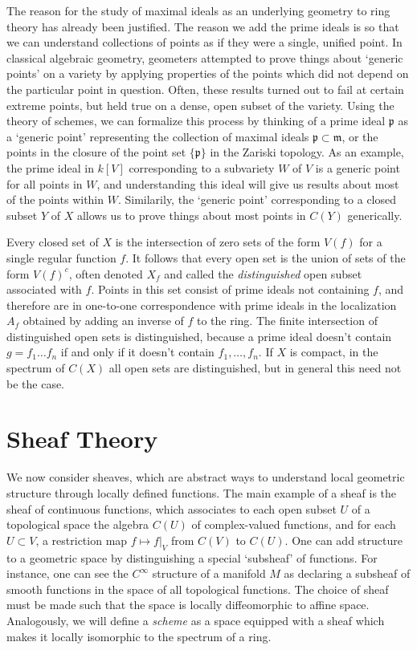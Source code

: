 The reason for the study of maximal ideals as an underlying geometry to ring theory has already been justified. The reason we add the prime ideals is so that we can understand collections of points as if they were a single, unified point. In classical algebraic geometry, geometers attempted to prove things about `generic points' on a variety by applying properties of the points which did not depend on the particular point in question. Often, these results turned out to fail at certain extreme points, but held true on a dense, open subset of the variety. Using the theory of schemes, we can formalize this process by thinking of a prime ideal $\mathfrak{p}$ as a `generic point' representing the collection of maximal ideals $\mathfrak{p} \subset \mathfrak{m}$, or the points in the closure of the point set $\{ \mathfrak{p} \}$ in the Zariski topology. As an example, the prime ideal in $k[V]$ corresponding to a subvariety $W$ of $V$ is a generic point for all points in $W$, and understanding this ideal will give us results about most of the points within $W$. Similarily, the `generic point' corresponding to a closed subset $Y$ of $X$ allows us to prove things about most points in $C(Y)$ generically.

Every closed set of $X$ is the intersection of zero sets of the form $V(f)$ for a single regular function $f$. It follows that every open set is the union of sets of the form $V(f)^c$, often denoted $X_f$ and called the \emph{distinguished} open subset associated with $f$. Points in this set consist of prime ideals not containing $f$, and therefore are in one-to-one correspondence with prime ideals in the localization $A_f$ obtained by adding an inverse of $f$ to the ring. The finite intersection of distinguished open sets is distinguished, because a prime ideal doesn't contain $g = f_1 \dots f_n$ if and only if it doesn't contain $f_1, \dots, f_n$. If $X$ is compact, in the spectrum of $C(X)$ all open sets are distinguished, but in general this need not be the case.

\section{Sheaf Theory}

We now consider sheaves, which are abstract ways to understand local geometric structure through locally defined functions. The main example of a sheaf is the sheaf of continuous functions, which associates to each open subset $U$ of a topological space the algebra $C(U)$ of complex-valued functions, and for each $U \subset V$, a restriction map $f \mapsto f|_V$ from $C(V)$ to $C(U)$. One can add structure to a geometric space by distinguishing a special `subsheaf' of functions. For instance, one can see the $C^\infty$ structure of a manifold $M$ as declaring a subsheaf of smooth functions in the space of all topological functions. The choice of sheaf must be made such that the space is locally diffeomorphic to affine space. Analogously, we will define a {\it scheme} as a space equipped with a sheaf which makes it locally isomorphic to the spectrum of a ring.

